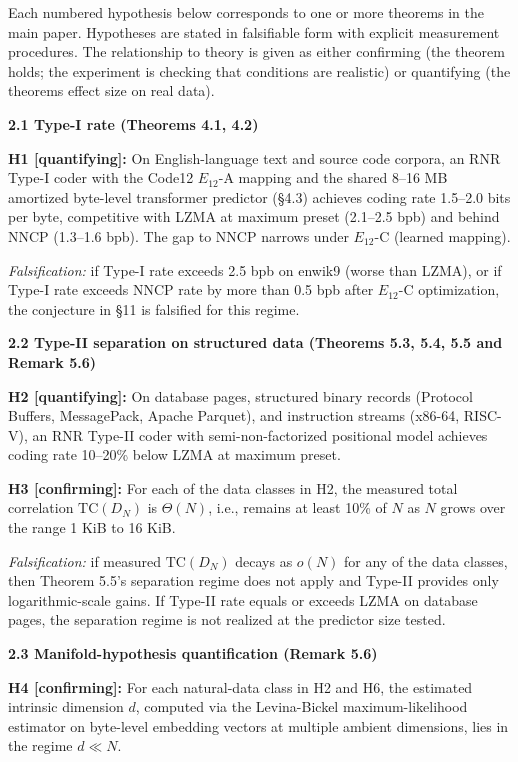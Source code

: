 \documentclass[
]{article}
\begin{document}
Each numbered hypothesis below corresponds to one or more theorems in
the main paper. Hypotheses are stated in falsifiable form with explicit
measurement procedures. The relationship to theory is given as either
confirming (the theorem holds; the experiment is checking that
conditions are realistic) or quantifying (the theorem\textquotesingle s
effect size on real data).

\textbf{2.1 Type-I rate (Theorems 4.1, 4.2)}

\textbf{H1 {[}quantifying{]}:} On English-language text and source code
corpora, an RNR Type-I coder with the Code12 $E_{12}$-A mapping and the
shared 8--16 MB amortized byte-level transformer predictor (§4.3)
achieves coding
rate 1.5--2.0 bits per byte, competitive with LZMA at maximum preset
(2.1--2.5 bpb) and behind NNCP (1.3--1.6 bpb). The gap to NNCP narrows
under $E_{12}$-C (learned mapping).

\emph{Falsification:} if Type-I rate exceeds 2.5 bpb on enwik9 (worse
than LZMA), or if Type-I rate exceeds NNCP rate by more than 0.5 bpb
after $E_{12}$-C optimization, the conjecture in §11 is falsified for this
regime.

\textbf{2.2 Type-II separation on structured data (Theorems 5.3, 5.4,
5.5 and Remark 5.6)}

\textbf{H2 {[}quantifying{]}:} On database pages, structured binary
records (Protocol Buffers, MessagePack, Apache Parquet), and instruction
streams (x86-64, RISC-V), an RNR Type-II coder with semi-non-factorized
positional model achieves coding rate 10--20\% below LZMA at maximum
preset.

\textbf{H3 {[}confirming{]}:} For each of the data classes in H2,
the measured total correlation $\mathrm{TC}(D_N)$ is $\Theta(N)$,
i.e., remains at least 10\% of $N$ as $N$ grows over the range 1
KiB to 16 KiB.

\emph{Falsification:} if measured $\mathrm{TC}(D_N)$ decays as
$o(N)$ for any of the data classes, then Theorem 5.5's separation
regime does not apply and Type-II provides only logarithmic-scale
gains. If Type-II rate equals or exceeds LZMA on database pages,
the separation regime is not realized at the predictor size tested.

\textbf{2.3 Manifold-hypothesis quantification (Remark 5.6)}

\textbf{H4 {[}confirming{]}:} For each natural-data class in H2 and
H6, the estimated intrinsic dimension $d$, computed via the
Levina-Bickel maximum-likelihood estimator on byte-level embedding
vectors at multiple ambient dimensions, lies in the regime
$d \ll N$.
\end{document}
